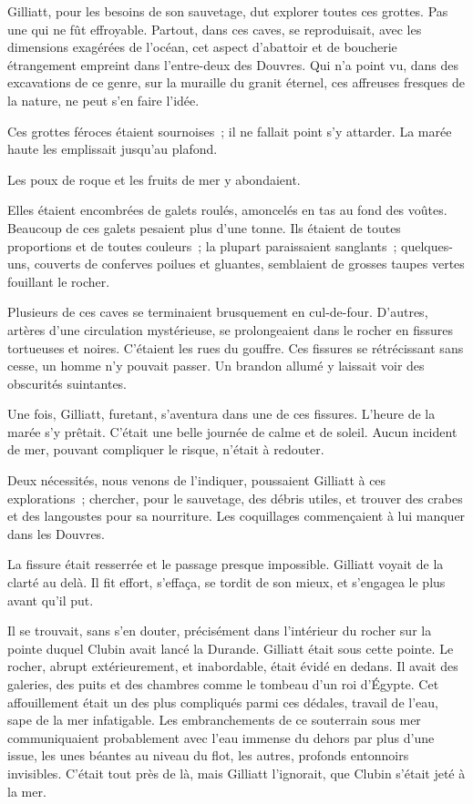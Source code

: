 \documentclass[french,twoside]{book} %
\begin{document}
Gilliatt, pour les besoins de son sauvetage, dut explorer toutes ces grottes. Pas une qui ne fût effroyable. Partout, dans ces caves, se reproduisait, avec les dimensions exagérées de l’océan, cet aspect d’abattoir et de boucherie étrangement empreint dans l’entre-deux des Douvres. Qui n’a point vu, dans des excavations de ce genre, sur la muraille du granit éternel, ces affreuses fresques de la nature, ne peut s’en faire l’idée.\par
Ces grottes féroces étaient sournoises ; il ne fallait point s’y attarder. La marée haute les emplissait jusqu’au plafond.\par
Les poux de roque et les fruits de mer y abondaient.\par
Elles étaient encombrées de galets roulés, amoncelés en tas au fond des voûtes. Beaucoup de ces galets pesaient plus d’une tonne. Ils étaient de toutes proportions et de toutes couleurs ; la plupart paraissaient sanglants ; quelques-uns, couverts de conferves poilues et gluantes, semblaient de grosses taupes vertes fouillant le rocher.\par
Plusieurs de ces caves se terminaient brusquement en cul-de-four. D’autres, artères d’une circulation mystérieuse, se prolongeaient dans le rocher en fissures  tortueuses et noires. C’étaient les rues du gouffre. Ces fissures se rétrécissant sans cesse, un homme n’y pouvait passer. Un brandon allumé y laissait voir des obscurités suintantes.\par
Une fois, Gilliatt, furetant, s’aventura dans une de ces fissures. L’heure de la marée s’y prêtait. C’était une belle journée de calme et de soleil. Aucun incident de mer, pouvant compliquer le risque, n’était à redouter.\par
Deux nécessités, nous venons de l’indiquer, poussaient Gilliatt à ces explorations ; chercher, pour le sauvetage, des débris utiles, et trouver des crabes et des langoustes pour sa nourriture. Les coquillages commençaient à lui manquer dans les Douvres.\par
La fissure était resserrée et le passage presque impossible. Gilliatt voyait de la clarté au delà. Il fit effort, s’effaça, se tordit de son mieux, et s’engagea le plus avant qu’il put.\par
Il se trouvait, sans s’en douter, précisément dans l’intérieur du rocher sur la pointe duquel Clubin avait lancé la Durande. Gilliatt était sous cette pointe. Le rocher, abrupt extérieurement, et inabordable, était évidé en dedans. Il avait des galeries, des puits et des chambres comme le tombeau d’un roi d’Égypte. Cet affouillement était un des plus compliqués parmi ces dédales, travail de l’eau, sape de la mer infatigable. Les embranchements de ce souterrain sous mer communiquaient probablement avec l’eau immense du dehors par plus d’une issue, les unes béantes au niveau du flot, les autres, profonds entonnoirs invisibles.  C’était tout près de là, mais Gilliatt l’ignorait, que Clubin s’était jeté à la mer.\par
\end{document}

